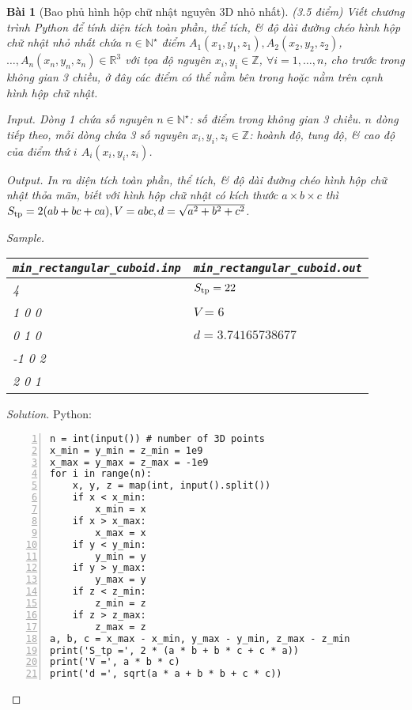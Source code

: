 \documentclass{article}
\newtheorem{baitoan}{Bài}
\begin{document}
\begin{baitoan}[Bao phủ hình hộp chữ nhật nguyên 3D nhỏ nhất]
	{\rm(3.5 điểm)} Viết chương trình Python để tính diện tích toàn phần, thể tích, \& độ dài đường chéo hình hộp chữ nhật nhỏ nhất chứa $n\in\mathbb{N}^\star$ điểm $A_1(x_1,y_1,z_1),A_2(x_2,y_2,z_2)$, $\ldots,A_n(x_n,y_n,z_n)\in\mathbb{R}^3$ với tọa độ nguyên $x_i,y_i\in\mathbb{Z}$, $\forall i = 1,\ldots,n$, cho trước trong không gian 3 chiều, ở đây các điểm có thể nằm bên trong hoặc nằm trên cạnh hình hộp chữ nhật.
	\item {\sf Input.} Dòng 1 chứa số nguyên $n\in\mathbb{N}^\star$: số điểm trong không gian 3 chiều. $n$ dòng tiếp theo, mỗi dòng chứa 3 số nguyên $x_i,y_i,z_i\in\mathbb{Z}$: hoành độ, tung độ, \& cao độ của điểm thứ $i$ $A_i(x_i,y_i,z_i)$.
	\item {\sf Output.} In ra diện tích toàn phần, thể tích, \& độ dài đường chéo hình hộp chữ nhật thỏa mãn, biết với hình hộp chữ nhật có kích thước $a\times b\times c$ thì $S_{\rm tp} = 2(ab + bc + ca),V = abc,d = \sqrt{a^2 + b^2 + c^2}$.
	\item {\sf Sample.}
	\begin{table}[H]
		\centering
		\begin{tabular}{|l|l|}
			\hline
			\verb|min_rectangular_cuboid.inp| & \verb|min_rectangular_cuboid.out| \\
			\hline
			4 & $S_{\rm tp} = 22$ \\
			1 0 0& $V = 6$ \\
			0 1 0 & $d = 3.74165738677 $ \\
			-1 0 2 & \\
			2 0 1 & \\
			\hline
		\end{tabular}
	\end{table}
\end{baitoan}

\begin{proof}[Solution]
    Python:
    \begin{Verbatim}[numbers=left,xleftmargin=5mm]
n = int(input()) # number of 3D points
x_min = y_min = z_min = 1e9
x_max = y_max = z_max = -1e9
for i in range(n):
	x, y, z = map(int, input().split())
	if x < x_min:
		x_min = x
	if x > x_max:
		x_max = x
	if y < y_min:
		y_min = y
	if y > y_max:
		y_max = y
	if z < z_min:
		z_min = z
	if z > z_max:
		z_max = z
a, b, c = x_max - x_min, y_max - y_min, z_max - z_min
print('S_tp =', 2 * (a * b + b * c + c * a))
print('V =', a * b * c)
print('d =', sqrt(a * a + b * b + c * c))
    \end{Verbatim}
\end{proof}


\printbibliography[heading=bibintoc]
	
\end{document}
